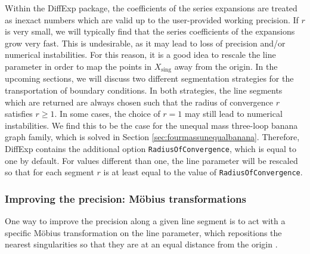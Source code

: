 \documentclass{article}
\begin{document}
Within the DiffExp package, the coefficients of the series expansions are treated as inexact numbers which are valid up to the user-provided working precision. If $r$ is very small, we will typically find that the series coefficients of the expansions grow very fast. This is undesirable, as it may lead to loss of precision and/or numerical instabilities. For this reason, it is a good idea to rescale the line parameter in order to map the points in $X_\text{sing}$ away from the origin. In the upcoming sections, we will discuss two different segmentation strategies for the transportation of boundary conditions. In both strategies, the line segments which are returned are always chosen such that the radius of convergence $r$ satisfies $r\geq 1$. In some cases, the choice of $r=1$ may still lead to numerical instabilities. We find this to be the case for the unequal mass three-loop banana graph family, which is solved in Section \ref{sec:fourmassunequalbanana}. Therefore, DiffExp contains the additional option \texttt{RadiusOfConvergence}, which is equal to one by default. For values different than one, the line parameter will be rescaled so that for each segment $r$ is at least equal to the value of \texttt{RadiusOfConvergence}.

\subsubsection{Improving the precision: Möbius transformations}
\label{sec:mobiustransformations}
One way to improve the precision along a given line segment is to act with a specific Möbius transformation on the line parameter, which repositions the nearest singularities so that they are at an equal distance from the origin \cite{Frellesvig:2019byn}.
\end{document}
